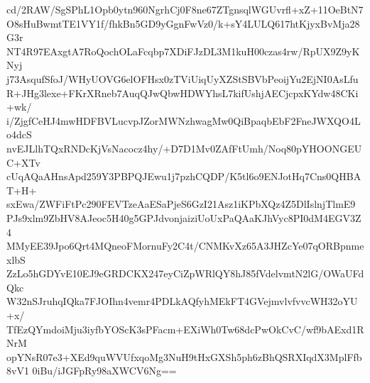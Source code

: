 cd/2RAW/SgSPhL1Opb0ytn960NgrhCj0F8ne67ZTgnsqlWGUvrfl+xZ+11OeBtN7
O8sHuBwmtTE1VY1f/fhkBn5GD9yGgnFwVz0/k+sY4LULQ617htKjyxBvMja28G3r
NT4R97EAxgtA7RoQochOLaFcqbp7XDiFJzDL3M1kuH00czas4rw/RpUX9Z9yKNyj
j73AsqufSfoJ/WHyUOVG6elOFHsx0zTViUiqUyXZStSBVbPeoijYu2EjNI0AsLfu
R+JHg3lexe+FKrXRneb7AuqQJwQbwHDWYhsL7kifUshjAECjcpxKYdw48CKi+wk/
i/ZjgfCeHJ4mwHDFBVLucvpJZorMWNzhwagMw0QiBpaqbEbF2FneJWXQO4Lo4dcS
nvEJLlhTQxRNDcKjVsNacocz4hy/+D7D1Mv0ZAfFtUmh/Noq80pYHOONGEUC+XTv
cUqAQaAHnsApd259Y3PBPQJEwu1j7pzhCQDP/K5tl6o9ENJotHq7Cns0QHBAT+H+
sxEwa/ZWFiFtPc290FEVTzeAaESaPjeS6GzI21Asz1iKPbXQz4Z5DlIslnjTlmE9
PJs9xlm9ZbHV8AJeoc5H40g5GPJdvonjaiziUoUxPaQAaKJhVyc8PI0dM4EGV3Z4
MMyEE39Jpo6Qrt4MQneoFMornuFy2C4t/CNMKvXz65A3JHZcYe07qORBpnmexlbS
ZzLo5hGDYvE10EJ9eGRDCKX247eyCiZpWRlQY8hJ85fVdelvmtN2lG/OWaUFdQkc
W32nSJruhqIQka7FJOIhn4vemr4PDLkAQfyhMEkFT4GVejmvlvfvvcWH32oYU+x/
TfEzQYmdoiMju3iyfbYOScK3sPFacm+EXiWh0Tw68dcPwOkCvC/wf9bAExd1RNrM
opYNsR07e3+XEd9quWVUfxqoMg3NuH9tHxGXSh5ph6zBhQSRXIqdX3MplFfb8vV1
0iBu/iJGFpRy98aXWCV6Ng==
